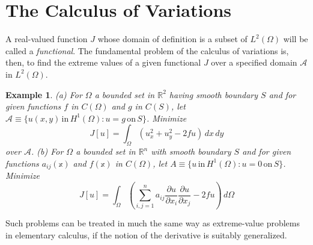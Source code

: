 \documentclass[11pt]{book}
\theoremstyle{example}
\newtheorem{example}{Example}[chapter]
\theoremstyle{problem}
\theoremstyle{theorem}
\theoremstyle{definition}
\begin{document}
\section{The Calculus of Variations}
A real-valued function $J$ whose domain of definition is a subset of $L^2(\Omega)$ will be called a \emph{functional}. The fundamental problem of the calculus of variations is, then, to find the extreme values of a given functional $J$ over a specified domain $\mathscr{A}$ in $L^2(\Omega)$.
\begin{example}\label{ex:variational}
	(a) For $\Omega$ a bounded set in $\mathbb{R}^2$ having smooth boundary $S$ and for given functions $f$ in $C(\Omega)$ and $g$ in $C(S)$, let $\mathscr{A}\equiv\{u(x,y)\,\mathrm{in}\,H^1(\Omega):u=g\,\mathrm{on}\,S\}$. Minimize
	\begin{equation}
		J[u]=\int_{\Omega}{(u_x^2+u_y^2-2fu)\,dx\,dy}
	\end{equation}
	over $\mathscr{A}$. (b) For $\Omega$ a bounded set in $\mathbb{R}^n$ with smooth boundary $S$ and for given functions $a_{ij}(\mathbb{x})$ and $f(\mathbb{x})$ in $C(\Omega)$, let $A\equiv\{u\,\mathrm{in}\,H^1(\Omega):u=0\,\mathrm{on}\,S\}$. Minimize
	\begin{equation}
		J[u]=\int_{\Omega}{{\left(\sum_{i,j=1}^na_{ij}\frac{\partial{u}}{\partial{x_i}}\frac{\partial{u}}{\partial{x_j}}-2fu\right)}\,d\Omega}
	\end{equation}
\end{example}
Such problems can be treated in much the same way as extreme-value problems in elementary calculus, if the notion of the derivative is suitably generalized.
\end{document}
